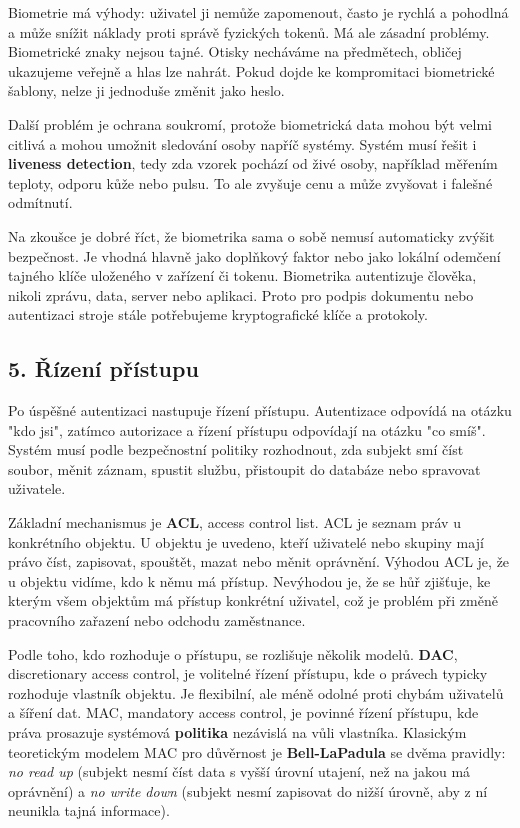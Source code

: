 \documentclass[11pt,a4paper]{article}
\begin{document}
Biometrie má výhody: uživatel ji nemůže zapomenout, často je rychlá a pohodlná a může snížit náklady proti správě fyzických tokenů. Má ale zásadní problémy. Biometrické znaky nejsou tajné. Otisky necháváme na předmětech, obličej ukazujeme veřejně a hlas lze nahrát. Pokud dojde ke kompromitaci biometrické šablony, nelze ji jednoduše změnit jako heslo.

Další problém je ochrana soukromí, protože biometrická data mohou být velmi citlivá a mohou umožnit sledování osoby napříč systémy. Systém musí řešit i \textbf{liveness detection}, tedy zda vzorek pochází od živé osoby, například měřením teploty, odporu kůže nebo pulsu. To ale zvyšuje cenu a může zvyšovat i falešné odmítnutí.

Na zkoušce je dobré říct, že biometrika sama o sobě nemusí automaticky zvýšit bezpečnost. Je vhodná hlavně jako doplňkový faktor nebo jako lokální odemčení tajného klíče uloženého v zařízení či tokenu. Biometrika autentizuje člověka, nikoli zprávu, data, server nebo aplikaci. Proto pro podpis dokumentu nebo autentizaci stroje stále potřebujeme kryptografické klíče a protokoly.

\subsection*{5. Řízení přístupu}

Po úspěšné autentizaci nastupuje řízení přístupu. Autentizace odpovídá na otázku "kdo jsi", zatímco autorizace a řízení přístupu odpovídají na otázku "co smíš". Systém musí podle bezpečnostní politiky rozhodnout, zda subjekt smí číst soubor, měnit záznam, spustit službu, přistoupit do databáze nebo spravovat uživatele.

Základní mechanismus je \textbf{ACL}, access control list. ACL je seznam práv u konkrétního objektu. U objektu je uvedeno, kteří uživatelé nebo skupiny mají právo číst, zapisovat, spouštět, mazat nebo měnit oprávnění. Výhodou ACL je, že u objektu vidíme, kdo k němu má přístup. Nevýhodou je, že se hůř zjišťuje, ke kterým všem objektům má přístup konkrétní uživatel, což je problém při změně pracovního zařazení nebo odchodu zaměstnance.

Podle toho, kdo rozhoduje o přístupu, se rozlišuje několik modelů. \textbf{DAC}, discretionary access control, je volitelné řízení přístupu, kde o právech typicky rozhoduje vlastník objektu. Je flexibilní, ale méně odolné proti chybám uživatelů a šíření dat. MAC, mandatory access control, je povinné řízení přístupu, kde práva prosazuje systémová \textbf{politika} nezávislá na vůli vlastníka. Klasickým teoretickým modelem MAC pro důvěrnost je \textbf{Bell-LaPadula} se dvěma pravidly: \emph{no read up} (subjekt nesmí číst data s vyšší úrovní utajení, než na jakou má oprávnění) a \emph{no write down} (subjekt nesmí zapisovat do nižší úrovně, aby z ní neunikla tajná informace).
\end{document}
